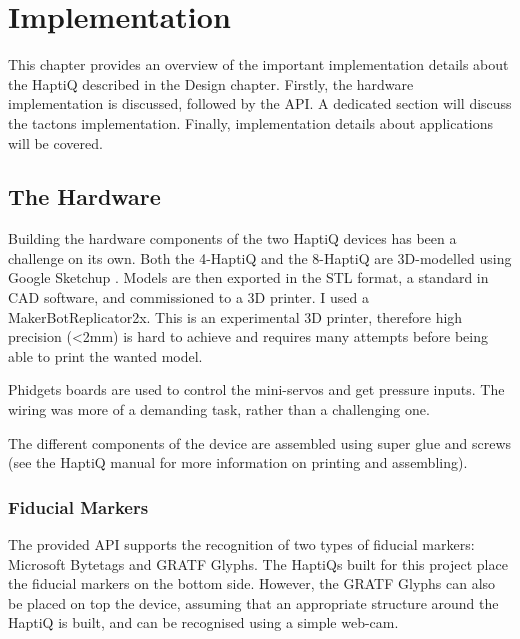 \chapter{Implementation}

This chapter provides an overview of the important implementation details about the HaptiQ described in the Design chapter. 
Firstly, the hardware implementation is discussed, followed by the API. A dedicated section will discuss the tactons implementation. Finally, implementation details about applications will be covered.

\section{The Hardware}

Building the hardware components of the two HaptiQ devices has been a challenge on its own. Both the 4-HaptiQ and the 8-HaptiQ are 3D-modelled using Google Sketchup . Models are then exported in the STL format, a standard in CAD software, and commissioned to a 3D printer. I used a MakerBot\textregistered   Replicator\texttrademark 2x. This is an experimental 3D printer, therefore high precision (\textless 2mm) is hard to achieve and requires many attempts before being able to print the wanted model. 

Phidgets boards are used to control the mini-servos and get pressure inputs. The wiring was more of a demanding task, rather than a challenging one.  

The different components of the device are assembled using super glue and screws (see the HaptiQ manual for more information on printing and assembling). 

\subsection{Fiducial Markers}

The provided API supports the recognition of two types of fiducial markers: Microsoft Bytetags and GRATF Glyphs. The HaptiQs built for this project place the fiducial markers on the bottom side. However, the GRATF Glyphs can also be placed on top the device, assuming that an appropriate structure around the HaptiQ is built, and can be recognised using a simple web-cam.  

